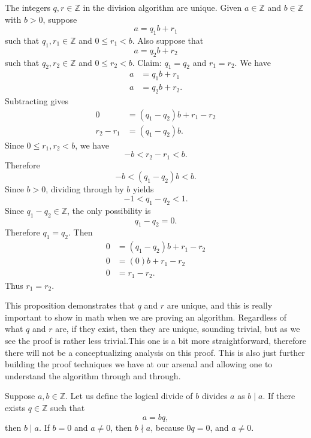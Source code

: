 \begin{proposition}{
    The integers $q,r\in\mathbb{Z}$ in the division algorithm are unique.
}
    Given $a\in\mathbb{Z}$ and $b\in\mathbb{Z}$ with $b>0$, suppose
    \[
        a = q_{1}b + r_1
    \]
    such that $q_1,r_1\in\mathbb{Z}$ and $0\leq r_1 < b$.
    Also suppose that
    \[
        a = q_{2}b + r_2
    \]
    such that $q_2,r_2\in\mathbb{Z}$ and $0\leq r_2 < b$.
    Claim:
    $q_1 = q_2$ and $r_1 = r_2$.
    We have
    \begin{align*}
        a &= q_{1}b + r_1\\
        a &= q_{2}b + r_2.
    \end{align*}
    Subtracting gives
    \begin{align*}
        0 &= (q_1 - q_2)b + r_1 - r_2\\
        r_2 - r_1 &= (q_1 - q_2)b.
    \end{align*}
    Since $0\leq r_1,r_2 < b$, we have
    \[
        -b < r_2 - r_1 < b.
    \]
    Therefore
    \[
        -b < (q_1 - q_2)b < b.
    \]
    Since $b>0$, dividing through by $b$ yields
    \[
        -1 < q_1 - q_2 < 1.
    \]
    Since $q_1-q_2\in\mathbb{Z}$, the only possibility is
    \[
        q_1 - q_2 = 0.
    \]
    Therefore $q_1 = q_2$.
    Then
    \begin{align*}
        0 &= (q_1 - q_2)b + r_1 - r_2\\
        0 &= (0)b + r_1 - r_2\\
        0 &= r_1 - r_2.
    \end{align*}
    Thus $r_1 = r_2$.
\end{proposition}

This proposition demonstrates that $q$ and $r$ are unique, and this is really important to show in math when we are proving an algorithm.
Regardless of what $q$ and $r$ are, if they exist, then they are unique, sounding trivial, but as we see the proof is rather less trivial.This one is a bit more straightforward, therefore there will not be a conceptualizing analysis on this proof.
This is also just further building the proof techniques we have at our arsenal and allowing one to understand the algorithm through and through.

\begin{definition}
    Suppose $a,b\in\mathbb{Z}$.
    Let us define the logical divide of $b$ divides $a$ as $b\mid a$.
    If there exists $q\in\mathbb{Z}$ such that
    \[
        a = bq,
    \]
    then $b\mid a$.
    If $b = 0$ and $a \neq 0$, then $b\nmid a$, because $0q = 0$, and $a\neq 0$.
\end{definition}

